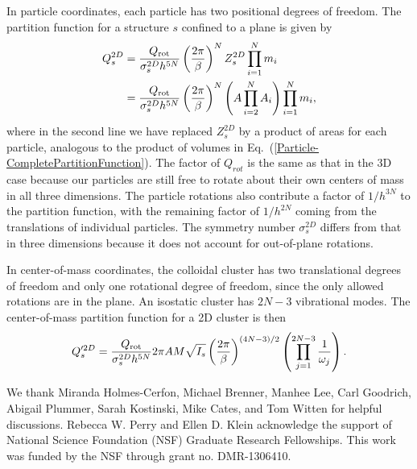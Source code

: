 \documentclass[pre, aps, twocolumn, reprint, amsmath,amssymb, showpacs,
superscriptaddress] {revtex4-1}
\begin{document}
In particle coordinates, each particle has two positional degrees of
freedom. The partition function for a structure $s$ confined to a plane
is given by
\begin{equation}\label{2DParticle-CompletePartitionFunction}
	\begin{split}
		Q_{s}^{2D} 
        & = \frac{Q_\textnormal{rot}}{\sigma_s^{2D} h^{5N}} \left( \frac{2 \pi}{\beta} \right)^{N}  Z_{s}^{2D} \prod_{i=1}^{N} m_i \\
      & = \frac{Q_\textnormal{rot}}{\sigma_s^{2D} h^{5N}} \left( \frac{2 \pi}{\beta} \right)^{N}  \left( A\prod_{i=2}^N A_i \right)\prod_{i=1}^{N} m_i,
   \end{split}
\end{equation}
where in the second line we have replaced $Z_{s}^{2D}$ by a product of
areas for each particle, analogous to the product of volumes in
Eq.~(\ref{Particle-CompletePartitionFunction}). The factor of $Q_{rot}$
is the same as that in the 3D case because our particles are still free
to rotate about their own centers of mass in all three dimensions. The
particle rotations also contribute a factor of $1/h^{3N}$ to the
partition function, with the remaining factor of $1/h^{2N}$ coming from
the translations of individual particles. The symmetry number
$\sigma_s^{2D}$ differs from that in three dimensions because it does
not account for out-of-plane rotations.

In center-of-mass coordinates, the colloidal cluster has two
translational degrees of freedom and only one rotational degree of
freedom, since the only allowed rotations are in the plane. An isostatic
cluster has $2N-3$ vibrational modes. The center-of-mass partition
function for a 2D cluster is then
\begin{equation}\label{2DCOM-CompletePartitionFunction}
  Q_{s}^{\prime 2D} = \frac{Q_\textnormal{rot}}{ \sigma_{s}^{2D}h^{5N}} 2\pi A M \sqrt{I_{s}}
  \left( {\frac{2\pi}{\beta}} \right)^{(4N-3)/2}  \left( \prod_{j=1}^{2N-3} \frac{1}{\omega_j} \right).
\end{equation}


\begin{acknowledgments}
  We thank Miranda Holmes-Cerfon, Michael Brenner, Manhee Lee, Carl
  Goodrich, Abigail Plummer, Sarah Kostinski, Mike Cates, and Tom Witten
  for helpful discussions. Rebecca W. Perry and Ellen D. Klein
  acknowledge the support of National Science Foundation (NSF) Graduate
  Research Fellowships. This work was funded by the NSF through grant
  no. DMR-1306410.
\end{acknowledgments}



\end{document}
